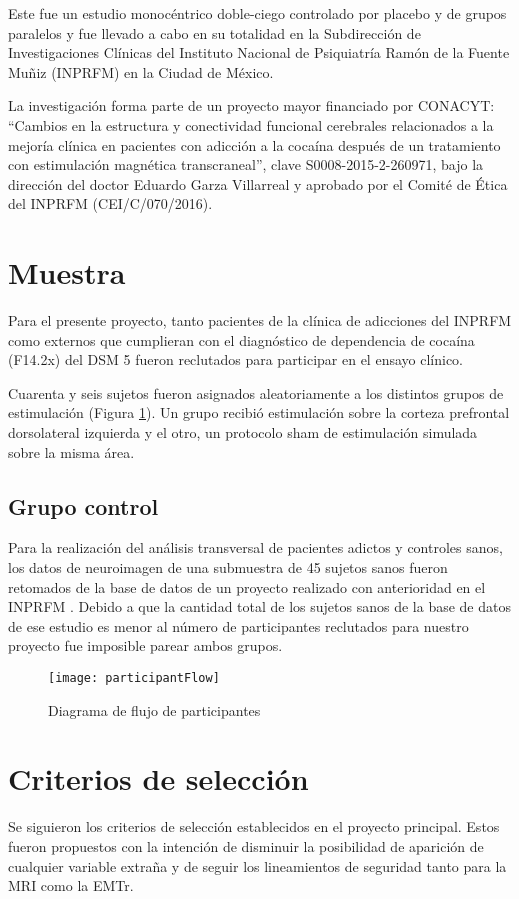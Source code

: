 Este fue un estudio monocéntrico doble-ciego controlado por placebo y de grupos paralelos y fue llevado a cabo en su totalidad en la Subdirección de Investigaciones Clínicas del Instituto Nacional de Psiquiatría Ramón de la Fuente Muñiz (INPRFM) en la Ciudad de México.\par
La investigación forma parte de un proyecto mayor financiado por CONACYT:
``Cambios en la estructura y conectividad funcional cerebrales relacionados a la mejoría clínica en pacientes con adicción a la cocaína después de un tratamiento con estimulación magnética transcraneal'',
clave S0008-2015-2-260971, bajo la dirección del doctor Eduardo Garza Villarreal y aprobado por el Comité de Ética del INPRFM (CEI/C/070/2016).

\section{Muestra}
Para el presente proyecto, tanto pacientes de la clínica de adicciones del INPRFM como externos que cumplieran con el diagnóstico de dependencia de cocaína (F14.2x) del DSM 5 \parencite{APA2013} fueron reclutados para participar en el ensayo clínico.\par
Cuarenta y seis sujetos fueron asignados aleatoriamente a los distintos grupos de estimulación (Figura \ref{fig:flow}).
Un grupo recibió estimulación sobre la corteza prefrontal dorsolateral izquierda y el otro, un protocolo sham de estimulación simulada sobre la misma área.

\subsection{Grupo control}
Para la realización del análisis transversal de pacientes adictos y controles sanos, los datos de neuroimagen de una submuestra de 45 sujetos sanos fueron retomados de la base de datos de un proyecto realizado con anterioridad en el INPRFM \parencite{Garza2017}.
Debido a que la cantidad total de los sujetos sanos de la base de datos de ese estudio es menor al número de participantes reclutados para nuestro proyecto fue imposible parear ambos grupos.

\begin{figure}[H]
    \centering
    \texttt{[image: participantFlow]}
    \caption{Diagrama de flujo de participantes}
    \label{fig:flow}
\end{figure}

\section{Criterios de selección}
Se siguieron los criterios de selección establecidos en el proyecto principal.
Estos fueron propuestos con la intención de disminuir la posibilidad de aparición de cualquier variable extraña y de seguir los lineamientos de seguridad tanto para la MRI como la EMTr.

